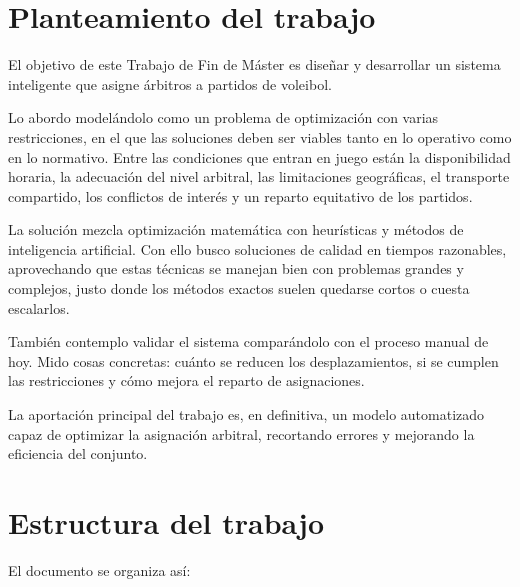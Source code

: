 \documentclass[11pt,a4paper,spanish]{book}
\numberwithin{equation}{chapter}
\numberwithin{figure}{chapter}
\numberwithin{table}{chapter}
\begin{document}
\section{Planteamiento del trabajo}

El objetivo de este Trabajo de Fin de Máster es diseñar y desarrollar un sistema inteligente que asigne árbitros a partidos de voleibol.

Lo abordo modelándolo como un problema de optimización con varias restricciones, en el que las soluciones deben ser viables tanto en lo operativo como en lo normativo. Entre las condiciones que entran en juego están la disponibilidad horaria, la adecuación del nivel arbitral, las limitaciones geográficas, el transporte compartido, los conflictos de interés y un reparto equitativo de los partidos.

La solución mezcla optimización matemática con heurísticas y métodos de inteligencia artificial. Con ello busco soluciones de calidad en tiempos razonables, aprovechando que estas técnicas se manejan bien con problemas grandes y complejos, justo donde los métodos exactos suelen quedarse cortos o cuesta escalarlos.

También contemplo validar el sistema comparándolo con el proceso manual de hoy. Mido cosas concretas: cuánto se reducen los desplazamientos, si se cumplen las restricciones y cómo mejora el reparto de asignaciones.

La aportación principal del trabajo es, en definitiva, un modelo automatizado capaz de optimizar la asignación arbitral, recortando errores y mejorando la eficiencia del conjunto.

\section{Estructura del trabajo}

El documento se organiza así:
\end{document}
